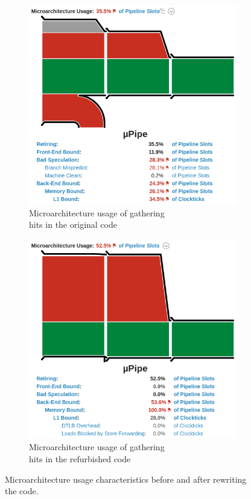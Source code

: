 \documentclass[12pt]{article}
\begin{document}
\begin{figure}[H]
	\centering
	\begin{subfigure}{.5\textwidth}
		\centering
		\includegraphics[width=\linewidth]{velout_gatherhits_orig_uarch}
		\caption{Microarchitecture usage of gathering\\ hits in the original code}
		\label{fig_velout_branch_example_sub1}
	\end{subfigure}%
	\begin{subfigure}{.5\textwidth}
		\centering
		\includegraphics[width=\linewidth]{velout_gatherhits_new_uarch}
		\caption{Microarchitecture usage of gathering\\ hits in the refurbished code}
		\label{fig_velout_branch_example_sub2}
	\end{subfigure}
	\caption{Microarchitecture usage characteristics before and after rewriting the code.}
	\label{fig_velout_branch_example}
\end{figure}
\end{document}
